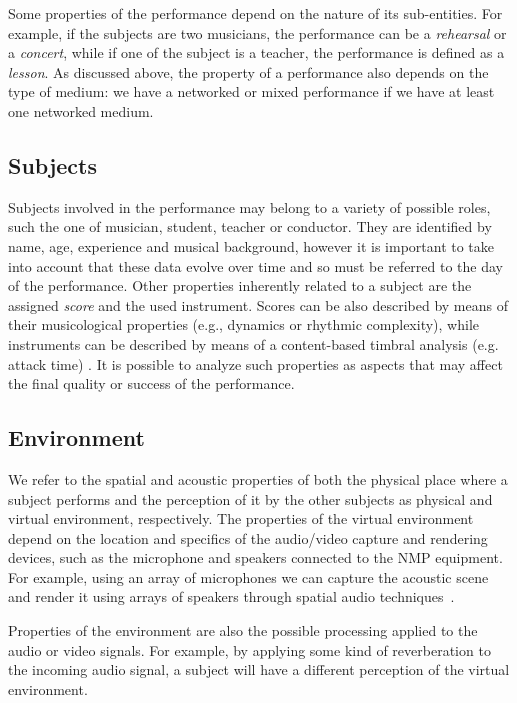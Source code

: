 Some properties of the performance depend on the nature of its sub-entities. For example, if the subjects are two musicians, the performance can be a \textit{rehearsal} or a \textit{concert}, while if one of the subject is a teacher, the performance is defined as a \textit{lesson}. As discussed above, the property of a performance also depends on the type of medium: we have a networked or mixed performance if we have at least one networked medium.   

\subsection{Subjects}
Subjects involved in the performance may belong to a variety of possible roles, such the one of musician, student, teacher or conductor. They are identified by name, age, experience and musical background, however it is important to take into account that these data evolve over time and so must be referred to the day of the performance. Other properties inherently related to a subject are the assigned \textit{score} and the used instrument. Scores can be also described by means of their musicological properties (e.g., dynamics or rhythmic complexity), while instruments can be described by means of a content-based timbral analysis (e.g. attack time) \cite{RottondiFeature}.
It is possible to analyze such properties as aspects that may affect the final quality or success of the performance.


\subsection{Environment}
We refer to the spatial and acoustic properties of both the physical place where a subject performs and the perception of it by the other subjects as physical and virtual environment, respectively. The properties of the virtual environment depend on the location and specifics of the audio/video capture and rendering devices, such as the microphone and speakers connected to the NMP equipment. For example, using an array of microphones we can capture the acoustic scene~\cite{Markovic2013} and render it using arrays of speakers through spatial audio techniques~\cite{bianchi2016}.

Properties of the environment are also the possible processing applied to the audio or video signals. For example, by applying some kind of reverberation to the incoming audio signal, a subject will have a different perception of the virtual environment.

